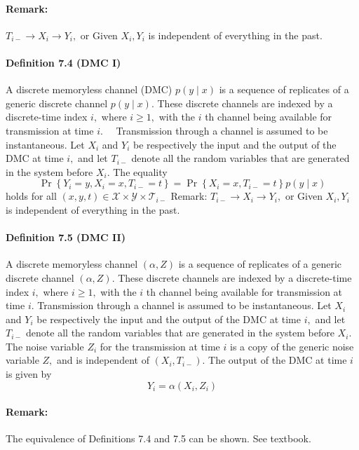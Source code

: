 \documentclass[8pt]{article}
\begin{document}
\paragraph{Remark:} $T_{i-} \rightarrow X_{i} \rightarrow Y_{i},$ or
Given $X_{i}, Y_{i}$ is independent of everything in the past.

\paragraph{Definition 7.4 (DMC I)} A discrete memoryless channel (DMC) $p(y \mid x)$ is a sequence of replicates of a generic discrete channel $p(y \mid x) .$ These discrete channels are indexed by a discrete-time index $i,$ where $i \geq 1,$ with the $i$ th channel being available for transmission at time $i . \quad$ Transmission through a channel is assumed to be instantaneous. Let $X_{i}$ and $Y_{i}$ be respectively the input and the output of the DMC at time $i,$ and let $T_{i-}$ denote all the random variables that are generated in the system before $X_{i} .$ The equality
$$
\operatorname{Pr}\left\{Y_{i}=y, X_{i}=x, T_{i-}=t\right\}=\operatorname{Pr}\left\{X_{i}=x, T_{i-}=t\right\} p(y \mid x)
$$
holds for all $(x, y, t) \in \mathcal{X} \times \mathcal{Y} \times \mathcal{T}_{i-}$
Remark: $T_{i-} \rightarrow X_{i} \rightarrow Y_{i},$ or
Given $X_{i}, Y_{i}$ is independent of everything in the past.

\paragraph{Definition 7.5 (DMC II)} A discrete memoryless channel $(\alpha, Z)$ is a sequence of replicates of a generic discrete channel $(\alpha, Z) .$ These discrete channels are indexed by a discrete-time index $i,$ where $i \geq 1,$ with the $i$ th channel being available for transmission at time $i$. Transmission through a channel is assumed to be instantaneous. Let $X_{i}$ and $Y_{i}$ be respectively the input and the output of the DMC at time $i,$ and let $T_{i-}$ denote all the random variables that are generated in the system before $X_{i} .$ The noise variable $Z_{i}$ for the transmission at time $i$ is a copy of the generic noise variable $Z,$ and is independent of $\left(X_{i}, T_{i-}\right)$. The output of the DMC at time $i$ is given by
$$
Y_{i}=\alpha\left(X_{i}, Z_{i}\right)
$$
\paragraph{Remark:} The equivalence of Definitions 7.4 and 7.5 can be shown. See textbook.
\end{document}
